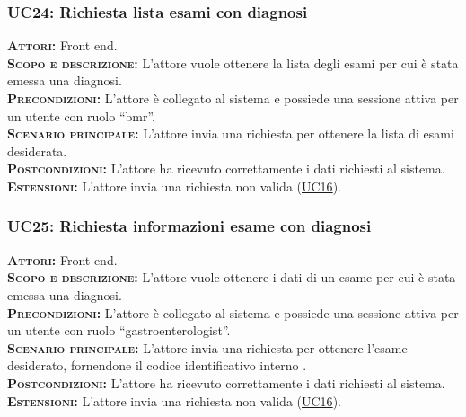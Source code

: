 \subsubsection{UC24: Richiesta lista esami con diagnosi}
\label{sec:UC24}
\textsc{\textbf{Attori:}} Front end.\\
\textsc{\textbf{Scopo e descrizione:}} L'attore vuole ottenere la lista degli esami per cui è stata emessa una diagnosi.\\
\textsc{\textsc{\textbf{Precondizioni:}}} L'attore è collegato al sistema e possiede una sessione attiva per un utente con ruolo ``bmr''.\\
\textsc{\textbf{Scenario principale:}} L'attore invia una richiesta per ottenere la lista di esami desiderata.\\
\textsc{\textbf{Postcondizioni:}} L'attore ha ricevuto correttamente i dati richiesti al sistema.\\
\textsc{\textbf{Estensioni:}} L'attore invia una richiesta non valida (\hyperref[sec:UC16]{UC16}).

\subsubsection{UC25: Richiesta informazioni esame con diagnosi}
\label{sec:UC25}
\textsc{\textbf{Attori:}} Front end.\\
\textsc{\textbf{Scopo e descrizione:}} L'attore vuole ottenere i dati di un esame per cui è stata emessa una diagnosi.\\
\textsc{\textsc{\textbf{Precondizioni:}}} L'attore è collegato al sistema e possiede una sessione attiva per un utente con ruolo ``gastroenterologist''.\\
\textsc{\textbf{Scenario principale:}}  L'attore invia una richiesta per ottenere l'esame desiderato, fornendone il codice identificativo interno .\\
\textsc{\textbf{Postcondizioni:}} L'attore ha ricevuto correttamente i dati richiesti al sistema.\\
\textsc{\textbf{Estensioni:}} L'attore invia una richiesta non valida (\hyperref[sec:UC16]{UC16}).

